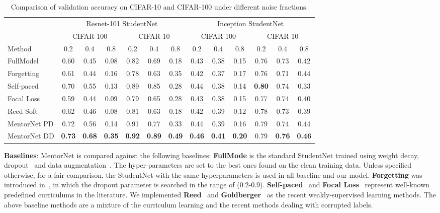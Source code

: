 \documentclass{article}
\begin{document}
\begin{table*}[ht]
\vspace{-4mm}
\centering
\caption{Comparison of validation accuracy on CIFAR-10 and CIFAR-100 under different noise fractions.}
\label{tab:cifar_comparison}
\begin{tabular}{|l|ccc|ccc|ccc|ccc|}
\hline
                & \multicolumn{6}{c|}{Resnet-101 StudentNet}  & \multicolumn{6}{c|}{Inception StudentNet}\\
                & \multicolumn{3}{c|}{CIFAR-100} & \multicolumn{3}{c|}{CIFAR-10} & \multicolumn{3}{c|}{CIFAR-100} & \multicolumn{3}{c|}{CIFAR-10} \\
Method & 0.2      & 0.4     & 0.8     & 0.2      & 0.4      & 0.8     & 0.2      & 0.4     & 0.8     & 0.2      & 0.4      & 0.8     \\
\hline
FullModel&0.60 & 0.45 & 0.08 &0.82 & 0.69 & 0.18 & 0.43 & 0.38 & 0.15 & 0.76 & 0.73 & 0.42\\
Forgetting&0.61&0.44&0.16&0.78&0.63&0.35&0.42&0.37&0.17&0.76&0.71&0.44\\
Self-paced& 0.70 & 0.55  &0.13 & 0.89&0.85&0.28 &0.44&0.38&0.14&\textbf{0.80}&0.74&0.33 \\     
Focal Loss&0.59&0.44&0.09&0.79&0.65&0.28&0.43&0.38&0.15&0.77&0.74&0.40 \\
Reed Soft&0.62&0.46&0.08&0.81&0.63&0.18&0.42&0.39&0.12&0.78&0.73&0.39\\
MentorNet PD &0.72&0.56&0.14&0.91&0.77&0.33&0.44&0.39&0.16&0.79&0.74&0.44\\
MentorNet DD &\textbf{0.73}& \textbf{0.68}  & \textbf{0.35} &  \textbf{0.92} & \textbf{0.89} &\textbf{0.49} &\textbf{0.46}& \textbf{0.41}&\textbf{0.20}&0.79&\textbf{0.76}&\textbf{0.46}\\
\hline
\end{tabular}
\vspace{-4mm}
\end{table*}


\noindent \textbf{Baselines}: MentorNet is compared against the following baselines: \textbf{FullMode} is the standard StudentNet trained using  weight decay, dropout~\cite{srivastava2014dropout} and data augmentation~\cite{krizhevsky2012imagenet}. The hyper-parameters are set to the best ones found on the clean training data. Unless specified otherwise, for a fair comparison, the StudentNet with the same hyperparameters is used in all baseline and our model. \textbf{Forgetting} was introduced in~\cite{arpit2017closer}, in which the dropout parameter is searched in the range of (0.2-0.9). \textbf{Self-paced}~\cite{kumar2010self} and \textbf{Focal Loss}~\cite{lin2017focal} represent well-known predefined curriculums in the literature. We implemented \textbf{Reed}~ and \textbf{Goldberger}~\cite{goldberger2017training} as the recent weakly-supervised learning methods. The above baseline methods are a mixture of the curriculum learning and the recent methods dealing with corrupted labels.
 
\end{document}
